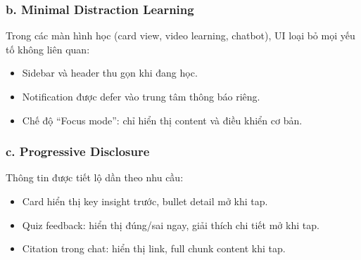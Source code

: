 \subsubsection*{b. Minimal Distraction Learning}

Trong các màn hình học (card view, video learning, chatbot), UI loại bỏ
mọi yếu tố không liên quan:

\begin{itemize}
    \item Sidebar và header thu gọn khi đang học.
    \item Notification được defer vào trung tâm thông báo riêng.
    \item Chế độ ``Focus mode'': chỉ hiển thị content và điều khiển cơ bản.
\end{itemize}

\subsubsection*{c. Progressive Disclosure}

Thông tin được tiết lộ dần theo nhu cầu:

\begin{itemize}
    \item Card hiển thị key insight trước, bullet detail mở khi tap.
    \item Quiz feedback: hiển thị đúng/sai ngay, giải thích chi tiết mở khi
          tap.
    \item Citation trong chat: hiển thị link, full chunk content khi tap.
\end{itemize}




